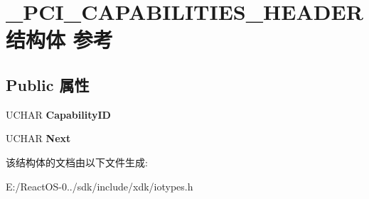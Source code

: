 \hypertarget{struct___p_c_i___c_a_p_a_b_i_l_i_t_i_e_s___h_e_a_d_e_r}{}\section{\+\_\+\+P\+C\+I\+\_\+\+C\+A\+P\+A\+B\+I\+L\+I\+T\+I\+E\+S\+\_\+\+H\+E\+A\+D\+E\+R结构体 参考}
\label{struct___p_c_i___c_a_p_a_b_i_l_i_t_i_e_s___h_e_a_d_e_r}
\subsection*{Public 属性}
\begin{DoxyCompactItemize}
\item 
\mbox{\label{struct___p_c_i___c_a_p_a_b_i_l_i_t_i_e_s___h_e_a_d_e_r_a6974b4f31bc9e4b7f1e04c8369037ccf}} 
U\+C\+H\+AR {\bfseries Capability\+ID}
\item 
\mbox{\label{struct___p_c_i___c_a_p_a_b_i_l_i_t_i_e_s___h_e_a_d_e_r_acf839d7eff2f925ff70a0365bde2a3d4}} 
U\+C\+H\+AR {\bfseries Next}
\end{DoxyCompactItemize}


该结构体的文档由以下文件生成\+:\begin{DoxyCompactItemize}
\item 
E\+:/\+React\+O\+S-\/0../sdk/include/xdk/iotypes.\+h\end{DoxyCompactItemize}
